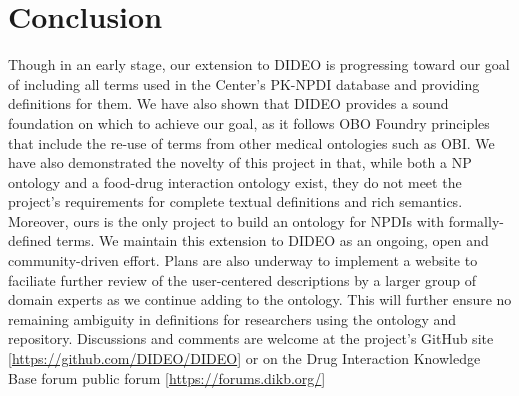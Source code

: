 \documentclass{bmcart}
\begin{document}
\section*{Conclusion}
Though in an early stage, our extension to DIDEO is progressing toward our goal of including all terms used in the Center's PK-NPDI database and providing definitions for them.
We have also shown that DIDEO provides a sound foundation on which to achieve our goal, as it follows OBO Foundry principles that include the re-use of terms from other medical ontologies such as OBI.
We have also demonstrated the novelty of this project in that, while both a NP ontology and a food-drug interaction ontology exist, they do not meet the project's requirements for complete textual definitions and rich semantics.
Moreover, ours is the only project to build an ontology for NPDIs with formally-defined terms.
We maintain this extension to DIDEO as an ongoing, open and community-driven effort.
Plans are also underway to implement a website to faciliate further review of the user-centered descriptions by a larger group of domain experts as we continue adding to the ontology.
This will further ensure no remaining ambiguity in definitions for researchers using the ontology and repository. %
Discussions and comments are welcome at the project's GitHub site [\url{https://github.com/DIDEO/DIDEO}] or on the Drug Interaction Knowledge Base forum public forum [\url{https://forums.dikb.org/}]

\end{document}
